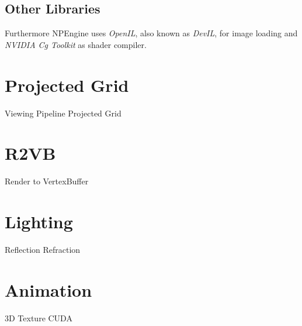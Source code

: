 \subsection{Other Libraries}
Furthermore NPEngine uses \textit{OpenIL}\cite{misc:devil}, also known as
\textit{DevIL}, for image loading and \textit{NVIDIA Cg Toolkit}\cite{misc:nvcg}
as shader compiler.

\section{Projected Grid}
Viewing Pipeline
Projected Grid

\section{R2VB}
Render to VertexBuffer

\section{Lighting}
Reflection
Refraction

\section{Animation}
3D Texture
CUDA